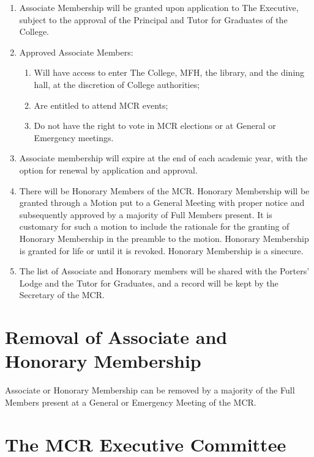 \documentclass[11pt, a4paper]{article}
\begin{document}
\begin{enumerate}
\begin{enumerate}
    \end{enumerate}
    \item Associate Membership will be granted upon application to The Executive, subject to the approval of the Principal and Tutor for Graduates of the College.
    \item Approved Associate Members:
    \begin{enumerate}
        \item Will have access to enter The College, MFH, the library, and the dining hall, at the discretion of College authorities;
        \item Are entitled to attend MCR events;
        \item Do not have the right to vote in MCR elections or at General or Emergency meetings.
    \end{enumerate}
    \item Associate membership will expire at the end of each academic year, with the option for renewal by application and approval.
    \item There will be Honorary Members of the MCR. Honorary Membership will be granted through a Motion put to a General Meeting with proper notice and subsequently approved by a majority of Full Members present. It is customary for such a motion to include the rationale for the granting of Honorary Membership in the preamble to the motion. Honorary Membership is granted for life or until it is revoked. Honorary Membership is a sinecure.
    \item The list of Associate and Honorary members will be shared with the Porters' Lodge and the Tutor for Graduates, and a record will be kept by the Secretary of the MCR.
\end{enumerate}





\section{Removal of Associate and Honorary Membership}
\label{sec:removal_member}

Associate or Honorary Membership can be removed by a majority of the Full Members present at a General or Emergency Meeting of the MCR.





\section{The MCR Executive Committee}
\label{sec:executive}
\end{document}
